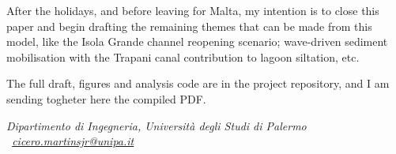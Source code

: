 \documentclass[11pt]{article}
\begin{document}
After the holidays, and before leaving for Malta, my intention is to close this
paper and begin drafting the remaining themes that can be made from this model, 
like the Isola Grande channel reopening scenario; wave-driven sediment
mobilisation with the Trapani canal contribution to lagoon siltation, etc.

The full draft, figures and analysis code are in the project repository, and I
am sending togheter here the compiled PDF.

\vspace{-0.2em}
{\footnotesize\itshape Dipartimento di Ingegneria, Universit\`a degli Studi di
Palermo \textperiodcentered\
\href{mailto:cicero.martinsjr@unipa.it}{cicero.martinsjr@unipa.it}}
\end{document}
